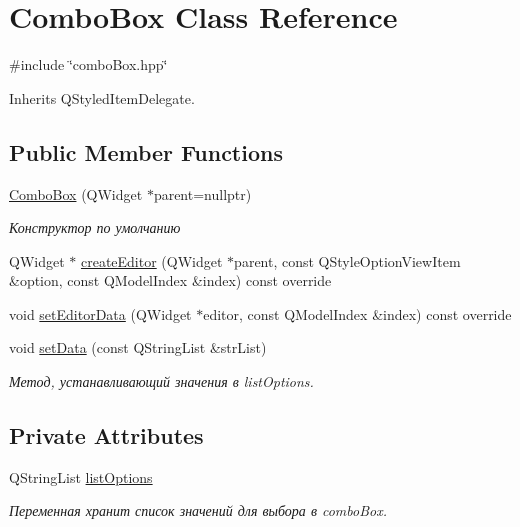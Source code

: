 \hypertarget{class_combo_box}{}\section{Combo\+Box Class Reference}
\label{class_combo_box}


{\ttfamily \#include \char`\"{}combo\+Box.\+hpp\char`\"{}}



Inherits Q\+Styled\+Item\+Delegate.

\subsection*{Public Member Functions}
\begin{DoxyCompactItemize}
\item 
\mbox{\label{class_combo_box_a2f76585fb600bb00ad3db90d0f578183}} 
\mbox{\hyperlink{class_combo_box_a2f76585fb600bb00ad3db90d0f578183}{Combo\+Box}} (Q\+Widget $\ast$parent=nullptr)
\begin{DoxyCompactList}\small\item\em Конструктор по умолчанию \end{DoxyCompactList}\item 
Q\+Widget $\ast$ \mbox{\hyperlink{class_combo_box_a1fd453e6efcb87acddce5038e0b539df}{create\+Editor}} (Q\+Widget $\ast$parent, const Q\+Style\+Option\+View\+Item \&option, const Q\+Model\+Index \&index) const override
\item 
void \mbox{\hyperlink{class_combo_box_aeb2ad78f056f1d46f8ad43531df65581}{set\+Editor\+Data}} (Q\+Widget $\ast$editor, const Q\+Model\+Index \&index) const override
\item 
\mbox{\label{class_combo_box_a6a25685870b74734a6fd5e3533ea6de6}} 
void \mbox{\hyperlink{class_combo_box_a6a25685870b74734a6fd5e3533ea6de6}{set\+Data}} (const Q\+String\+List \&str\+List)
\begin{DoxyCompactList}\small\item\em Метод, устанавливающий значения в list\+Options. \end{DoxyCompactList}\end{DoxyCompactItemize}
\subsection*{Private Attributes}
\begin{DoxyCompactItemize}
\item 
\mbox{\label{class_combo_box_a1299211beaf0017a3216230014f51613}} 
Q\+String\+List \mbox{\hyperlink{class_combo_box_a1299211beaf0017a3216230014f51613}{list\+Options}}
\begin{DoxyCompactList}\small\item\em Переменная хранит список значений для выбора в combo\+Box. \end{DoxyCompactList}\end{DoxyCompactItemize}



